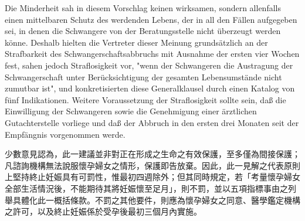 \documentclass[12pt]{article}
\begin{document}
\syncleft
\begin{sourcepara}
Die Minderheit sah in diesem Vorschlag keinen wirksamen, sondern allenfalls einen mittelbaren Schutz des werdenden Lebens, der in all den Fällen aufgegeben sei, in denen die Schwangere von der Beratungsstelle nicht überzeugt werden könne. Deshalb hielten die Vertreter dieser Meinung grundsätzlich an der Strafbarkeit des Schwangerschaftsabbruchs mit Ausnahme der ersten vier Wochen fest, sahen jedoch Straflosigkeit vor, "wenn der Schwangeren die Austragung der Schwangerschaft unter Berücksichtigung der gesamten Lebensumstände nicht zumutbar ist", und konkretisierten diese Generalklausel durch einen Katalog von fünf Indikationen. Weitere Voraussetzung der Straflosigkeit sollte sein, daß die Einwilligung der Schwangeren sowie die Genehmigung einer ärztlichen Gutachterstelle vorliege und daß der Abbruch in den ersten drei Monaten seit der Empfängnis vorgenommen werde.
\end{sourcepara}
\begin{transpara}
少數意見認為，此一建議並非對正在形成之生命之有效保護，至多僅為間接保護；凡諮詢機構無法說服懷孕婦女之情形，保護即告放棄。因此，此一見解之代表原則上堅持終止妊娠具有可罰性，惟最初四週除外；但其同時規定，若「考量懷孕婦女全部生活情況後，不能期待其將妊娠懷至足月」，則不罰，並以五項指標事由之列舉具體化此一概括條款。不罰之其他要件，則應為懷孕婦女之同意、醫學鑑定機構之許可，以及終止妊娠係於受孕後最初三個月內實施。
\end{transpara}
\end{document}

